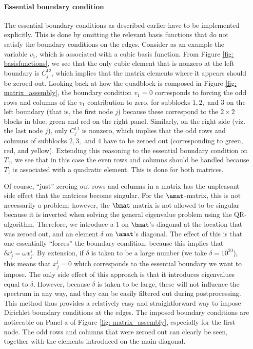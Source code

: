 \paragraph{Essential boundary condition}
The essential boundary conditions as described earlier have to be implemented explicitly. This is done by omitting the relevant basis functions that do not satisfy the boundary conditions on the edges. Consider as an example the variable $v_1$, which is associated with a cubic basis function. From Figure \ref{fig: basisfunctions}, we see that the only cubic element that is nonzero at the left boundary is $C_j^{12}$, which implies that the matrix elements where it appears should be zeroed out. Looking back at how the quadblock is composed in Figure \ref{fig: matrix_assembly}, the boundary condition $v_1 = 0$ corresponds to forcing the odd rows and columns of the $v_1$ contribution to zero, for subblocks $1, 2,$ and $3$ on the left boundary (that is, the first node $j$) because these correspond to the $2 \times 2$ blocks in blue, green and red on the right panel. Similarly, on the right side (viz. the last node $j$), only $C_j^{11}$ is nonzero, which implies that the odd rows and columns of subblocks $2, 3,$ and $4$ have to be zeroed out (corresponding to green, red, and yellow). Extending this reasoning to the essential boundary condition on $T_1$, we see that in this case the even rows and columns should be handled because $T_1$ is associated with a quadratic element. This is done for both matrices.

Of course, ``just'' zeroing out rows and columns in a matrix has the unpleasant side effect that the matrices become singular. For the $\amat$-matrix, this is not necessarily a problem; however, the $\bmat$ matrix is not allowed to be singular because it is inverted when solving the general eigenvalue problem using the QR-algorithm. Therefore, we introduce a 1 on $\bmat$'s diagonal at the location that was zeroed out, and an element $\delta$ on $\amat$'s diagonal. The effect of this is that one essentially ``forces'' the boundary condition, because this implies that $\delta x_j^i = \omega x_j^i$. By extension, if $\delta$ is taken to be a large number (we take $\delta = 10^{20}$), this means that $x_j^i = 0$ which corresponds to the essential boundary we want to impose. The only side effect of this approach is that it introduces eigenvalues equal to $\delta$. However, because $\delta$ is taken to be large, these will not influence the spectrum in any way, and they can be easily filtered out during postprocessing. This method thus provides a relatively easy and straightforward way to impose Dirichlet boundary conditions at the edges. The imposed boundary conditions are noticeable on Panel a of Figure \ref{fig: matrix_assembly}, especially for the first node. The odd rows and columns that were zeroed out can clearly be seen, together with the elements introduced on the main diagonal.

